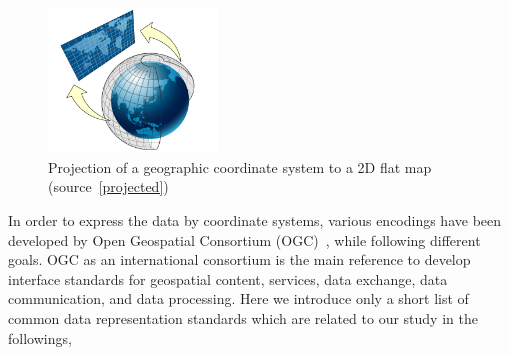 \documentclass[a4paper,12pt]{article}
\begin{document}
\begin{figure}
\centering
\includegraphics[width=0.4\textwidth]{sphere_to_cylinder}
\caption{Projection of a geographic coordinate system to a 2D flat map (source~\ref{projected})}
\label{figproject}
\end{figure}

In order to express the data by coordinate systems, various encodings have been developed by Open Geospatial Consortium (OGC)~\cite{ogc}, while following different goals. OGC as an international consortium is the main reference to develop interface standards for geospatial content, services, data exchange, data communication, and data processing. Here we introduce only a short list of common data representation standards which are related to our study in the followings,
\end{document}

